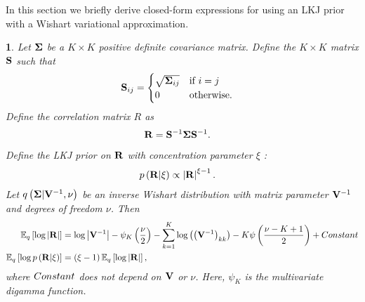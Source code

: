 \documentclass{article}\usepackage[]{graphicx}\usepackage[]{color}
\theoremstyle{plain}
\theoremstyle{definition}
\theoremstyle{plain}
\theoremstyle{plain}
\theoremstyle{plain}
\newtheorem{prop}[thm]{\protect\propositionname}
\theoremstyle{plain}
\providecommand{\propositionname}{Proposition}
\begin{document}
In this section we briefly derive closed-form expressions for using
an LKJ prior with a Wishart variational approximation.
\begin{prop}
Let $\boldsymbol{\Sigma}$ be a $K\times K$ positive definite covariance matrix.
Define the $K\times K$ matrix $\mathbf{S}$ such that
\begin{align*}
\mathbf{S}_{ij} & =\begin{cases}
\sqrt{\boldsymbol{\Sigma}_{ij}} & \textrm{if }i=j\\
0 & \textrm{otherwise}.
\end{cases}
\end{align*}
Define the correlation matrix $R$ as
\begin{align*}
\mathbf{R} & =\mathbf{S}^{-1}\boldsymbol{\Sigma}\mathbf{S}^{-1}.
\end{align*}
Define the LKJ prior on $\mathbf{R}$ with concentration parameter
$\xi$ \citep{lewandowski:2009:lkj}:
\begin{align*}
p\left(\mathbf{R}\vert\xi\right) & \propto\left|\mathbf{R}\right|^{\xi-1}.
\end{align*}
Let $q\left(\boldsymbol{\Sigma}\vert\mathbf{V}^{-1},\nu\right)$ be an inverse
Wishart distribution with matrix parameter $\mathbf{V}^{-1}$ and
degrees of freedom $\nu$. Then
\begin{align*}
\mathbb{E}_{q}\left[\log\left|\mathbf{R}\right|\right] & =\log\left|\mathbf{V}^{-1}\right|-\psi_{K}\left(\frac{\nu}{2}\right)-\sum_{k=1}^{K}\log\left(\left(\mathbf{V}^{-1}\right)_{kk}\right)-K\psi\left(\frac{\nu-K+1}{2}\right)+Constant\\
\mathbb{E}_{q}\left[\log p\left(\mathbf{R}\vert\xi\right)\right] & =\left(\xi-1\right)\mathbb{E}_{q}\left[\log\left|\mathbf{R}\right|\right],
\end{align*}
where $Constant$ does not depend on $\mathbf{V}$ or $\nu$. Here,
$\psi_{K}$ is the multivariate digamma function.
\end{prop}
\end{document}
